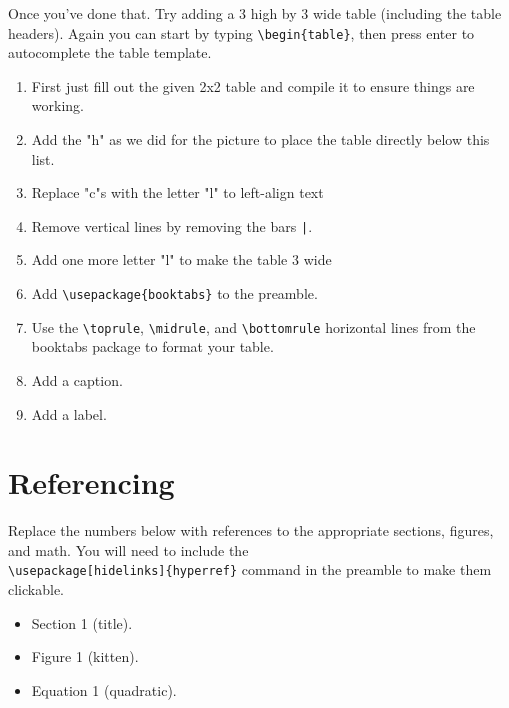     Once you've done that. Try adding a 3 high by 3 wide table (including the table headers). Again you can start by typing 
    \verb"\begin{table}", then press enter to autocomplete the table template. 
    \begin{enumerate}
        \item First just fill out the given 2x2 table and compile it to ensure things are working.
        \item Add the "h" as we did for the picture to place the table directly below this list.
        \item Replace "c"s with the letter "l" to left-align text
        \item Remove vertical lines by removing the bars \verb"|".
        \item Add one more letter "l" to make the table 3 wide
        \item Add \verb"\usepackage{booktabs}" to the preamble.
        \item Use the \verb"\toprule", \verb"\midrule", and \verb"\bottomrule" horizontal lines from the booktabs package to format your table.
        \item Add a caption.
        \item Add a label.
    \end{enumerate}

    \section{Referencing}
        Replace the numbers below with references to the appropriate sections, figures, and math. You will need to include the\\ \verb"\usepackage[hidelinks]{hyperref}" command in the preamble to make them clickable.

        \begin{itemize}
            \item Section 1 (title).
            \item Figure 1 (kitten).
            \item Equation 1 (quadratic).
        \end{itemize}
        

        

        
        
    


